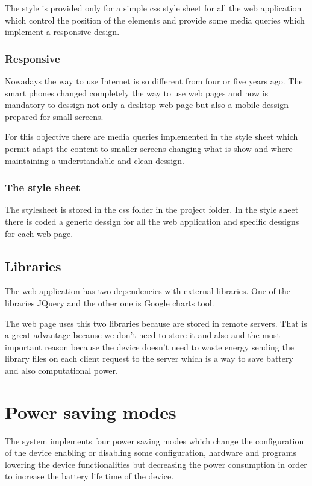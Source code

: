 		The style is provided only for a simple css style sheet for all the web application which control the position of the elements and provide some media queries which implement a responsive design.

		\subsubsection{Responsive}
		Nowadays the way to use Internet is so different from four or five years ago. The smart phones changed completely the way to use web pages and now is mandatory to dessign not only a desktop web page but also a mobile dessign prepared for small screens. 


		For this objective there are media queries implemented in the style sheet which permit adapt the content to smaller screens changing what is show and where maintaining a understandable and clean dessign.

		\subsubsection{The style sheet}
		The stylesheet is stored in the css folder in the project folder. In the style sheet there is coded a generic dessign for all the web application and specific dessigns for each web page.

		\subsection{Libraries}
		The web application has two dependencies with external libraries. One of the libraries JQuery and the other one is Google charts tool.

		The web page uses this two libraries because are stored in remote servers. That is a great advantage because we don't need to store it and also and the most important reason because the device doesn't need to waste energy sending the library files on each client request to the server which is a way to save battery and also computational power.

	\section{Power saving modes}\label{sec:powersavingmodes}
	The system implements four power saving modes which change the configuration of the device enabling or disabling some configuration, hardware and programs lowering the device functionalities but decreasing the power consumption in order to increase the battery life time of the device.
